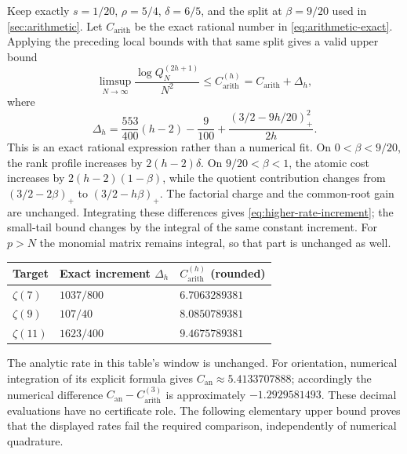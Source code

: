 \documentclass[11pt,letterpaper]{article}
\theoremstyle{definition}
\newcommand{\arith}{\mathrm{arith}}
\newcommand{\an}{\mathrm{an}}
\newcommand{\pos}[1]{\left(#1\right)_{+}}
\begin{document}
Keep exactly
$s=1/20$, $\rho=5/4$, $\delta=6/5$, and the split at $\beta=9/20$
used in \cref{sec:arithmetic}. Let $C_{\arith}$ be the exact rational
number in \eqref{eq:arithmetic-exact}. Applying the preceding local
bounds with that same split gives a valid upper bound
\begin{equation}\label{eq:higher-arithmetic-rate}
 \limsup_{N\to\infty}\frac{\log Q_N^{(2h+1)}}{N^2}
 \le C_{\arith}^{(h)}=C_{\arith}+\Delta_h,
\end{equation}
where
\begin{equation}\label{eq:higher-rate-increment}
 \Delta_h=
 \frac{553}{400}(h-2)-\frac9{100}
 +\frac{\pos{3/2-9h/20}^{2}}{2h}.
\end{equation}
This is an exact rational expression rather than a numerical fit.
On $0<\beta<9/20$, the rank profile increases by
$2(h-2)\delta$. On $9/20<\beta<1$, the atomic cost increases by
$2(h-2)(1-\beta)$, while the quotient contribution changes from
$(3/2-2\beta)_+$ to $(3/2-h\beta)_+$. The factorial charge and
the common-root gain are unchanged. Integrating these differences
gives \eqref{eq:higher-rate-increment}; the small-tail bound changes
by the integral of the same constant increment. For $p>N$ the
monomial matrix remains integral, so that part is unchanged as well.

\begin{center}
\begin{tabular}{@{}lll@{}}
\toprule
Target & Exact increment $\Delta_h$ & $C_{\arith}^{(h)}$ (rounded)\\
\midrule
$\zeta(7)$  & $1037/800$ & $6.7063289381$\\
$\zeta(9)$  & $107/40$   & $8.0850789381$\\
$\zeta(11)$ & $1623/400$ & $9.4675789381$\\
\bottomrule
\end{tabular}
\end{center}

The analytic rate in this table's window is unchanged. For orientation,
numerical integration of its explicit formula gives
$C_{\an}\approx5.4133707888$; accordingly the numerical difference
$C_{\an}-C_{\arith}^{(3)}$ is approximately $-1.2929581493$.
These decimal evaluations have no certificate role. The following
elementary upper bound proves that the displayed rates fail the
required comparison, independently of numerical quadrature.
\end{document}
